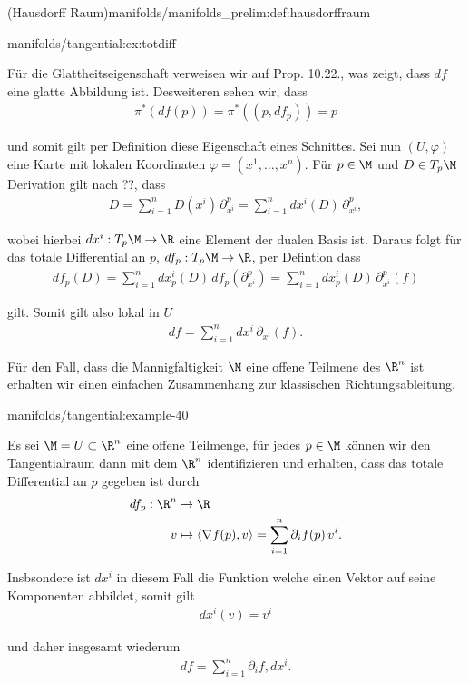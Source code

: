 \documentclass[letterpaper,10pt,english]{jupyterBook}
\begin{document}
\begin{definition}{(Hausdorff Raum)}{manifolds/manifolds_prelim:def:hausdorffraum}
\begin{example}{}{manifolds/tangential:ex:totdiff}
\par
Für die Glattheitseigenschaft verweisen wir auf \cite{Lee03} Prop. 10.22., was zeigt, dass \(df\) eine glatte Abbildung ist. Desweiteren sehen wir, dass
\begin{align*}
\pi^\ast(df(p)) = \pi^\ast((p,df_p)) = p\end{align*}
\par
und somit gilt per Definition diese Eigenschaft eines Schnittes. Sei nun \((U,\varphi)\) eine Karte mit lokalen Koordinaten \(\varphi = (x^1,\ldots, x^n)\). Für \(p\in\M\) und \(D\in T_p\M\) Derivation gilt nach ??, dass
\begin{align*}
D = \sum_{i=1}^n D(x^i)\, \partial_{x^i}^p = \sum_{i=1}^n dx^{i}(D)\, \partial_{x^i}^p,
\end{align*}
\par
wobei hierbei \(dx^{i}:T_p\M\to\R\) eine Element der dualen Basis ist. Daraus folgt für das totale Differential an \(p\), \(df_p:T_p\M\to\R\), per Defintion dass
\begin{align*}
df_p(D) = \sum_{i=1}^n dx_p^{i}(D)\, df_p(\partial_{x^i}^p) = 
\sum_{i=1}^n dx_p^{i}(D)\, \partial_{x^i}^p(f)
\end{align*}
\par
gilt. Somit gilt also lokal in \(U\)
\begin{align*}
df = \sum_{i=1}^n dx^{i}\, \partial_{x^i}(f).
\end{align*}\end{example}

\par
Für den Fall, dass die Mannigfaltigkeit \(\M\) eine offene Teilmene des \(\R^n\) ist erhalten wir einen einfachen Zusammenhang zur klassischen Richtungsableitung.
\begin{example}{}{manifolds/tangential:example-40}



\par
Es sei \(\M=U\subset\R^n\) eine offene Teilmenge, für jedes \(p\in\M\) können wir den Tangentialraum dann mit dem \(\R^n\) identifizieren und erhalten, dass das totale Differential an \(p\) gegeben ist durch
\begin{align*}
df_p:\R^n&\to\R\\
v&\mapsto \langle \nabla f(p), v \rangle = \sum_{i=1}^n \partial_i f(p)\, v^i.
\end{align*}
\par
Insbsondere ist \(dx^{i}\) in diesem Fall die Funktion welche einen Vektor auf seine Komponenten abbildet, somit gilt
\begin{align*}
dx^{i}(v) = v^i
\end{align*}
\par
und daher insgesamt wiederum
\begin{align*}
df = \sum_{i=1}^n \partial_i f, dx^{i}.
\end{align*}\end{example}


\end{definition}
\end{document}
